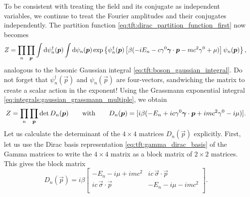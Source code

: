 To be consistent with treating the field and its conjugate as independent variables, we continue to treat the Fourier amplitudes and their conjugates independently.
The partition function \eqref{eq:tft:dirac_partition_function_first} now becomes 
\begin{equation}
	Z %
	  = \prod_n \prod_\vec{p} \int \dif \psi^\dagger_n(\vec{p}) \int \dif \psi_n(\vec{p}) 
	  \exp \left\{ \psi^\dagger_n(\vec{p}) \left[ \beta( -i E_n - c \gamma^0 \vec{\gamma} \cdot \vec{p} - mc^2 \gamma^0 + \mu ) \right] \psi_n(\vec{p}) \right\} , \\
\label{eq:tft:fermion_gaussian_integral}
\end{equation}
analogous to the bosonic Gaussian integral \eqref{eq:tft:boson_gaussian_integral}.
Do not forget that $\psi^\dagger_n(\vec{p})$ and $\psi_n(\vec{p})$ are four-vectors, sandwiching the matrix to create a scalar action in the exponent!
Using the Grassmann exponential integral \eqref{eq:integrals:gaussian_grassmann_multiple}, we obtain
\begin{equation}
	Z = \prod_n \prod_{\bm{p}} \operatorname{det}{D_n({\bm{p}})}
	\qquad \text{with} \qquad
	D_n({\bm{p}}) = [i \beta( -E_n + i c \gamma^0 {\bm{\gamma}} \cdot {\bm{p}} + i mc^2 \gamma^0 - i \mu )].
\end{equation}
Let us calculate the determinant of the $4 \times 4$ matrices $D_n(\vec{p})$ explicitly.
First, let us use the Dirac basis representation \eqref{eq:tft:gamma_dirac_basis} of the Gamma matrices to write the $4 \times 4$ matrix as a block matrix of $2 \times 2$ matrices.
This gives the block matrix
\begin{equation}
	D_n(\vec{p}) = i \beta \begin{bmatrix}
	                           -E_n - i \mu + i m c^2         & i c \, \vec{\sigma} \cdot \vec{p}    \\ 
	                           i c \, \vec{\sigma} \cdot \vec{p} & -E_n - i \mu - i m c^2 \\ 
	                       \end{bmatrix} .
\end{equation}
